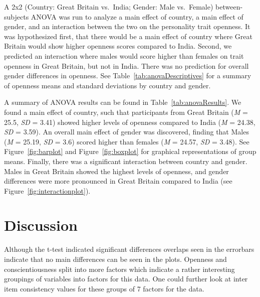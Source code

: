 \documentclass[
  english,
  man, fleqn, noextraspace]{apa6}
\begin{document}
A 2x2 (Country: Great Britain vs.~India; Gender: Male vs.~Female) between-subjects ANOVA was run to analyze a main effect of country, a main effect of gender, and an interaction between the two on the personality trait openness. It was hypothesized first, that there would be a main effect of country where Great Britain would show higher openness scores compared to India. Second, we predicted an interaction where males would score higher than females on trait openness in Great Britain, but not in India. There was no prediction for overall gender differences in openness. See Table~\ref{tab:anovaDescriptives} for a summary of openness means and standard deviations by country and gender.

A summary of ANOVA results can be found in Table~\ref{tab:anovaResults}. We found a main effect of country, such that participants from Great Britain (\emph{M} = 25.5, \emph{SD} = 3.41) showed higher levels of openness compared to India (\emph{M} = 24.38, \emph{SD} = 3.59). An overall main effect of gender was discovered, finding that Males (\emph{M} = 25.19, \emph{SD} = 3.6) scored higher than females (\emph{M} = 24.57, \emph{SD} = 3.48). See Figure~\ref{fig:barplot} and Figure~\ref{fig:boxplot} for graphical representations of group means. Finally, there was a significant interaction between country and gender. Males in Great Britain showed the highest levels of openness, and gender differences were more pronounced in Great Britain compared to India (see Figure~\ref{fig:interactionplot}).

\hypertarget{discussion}{%
\section{Discussion}\label{discussion}}

Although the t-test indicated significant differences overlaps seen in the errorbars indicate that no main differences can be seen in the plots. Openness and conscientiousness split into more factors which indicate a rather interesting groupings of variables into factors for this data. One could further look at inter item consistency values for these groups of 7 factors for the data.
\end{document}
